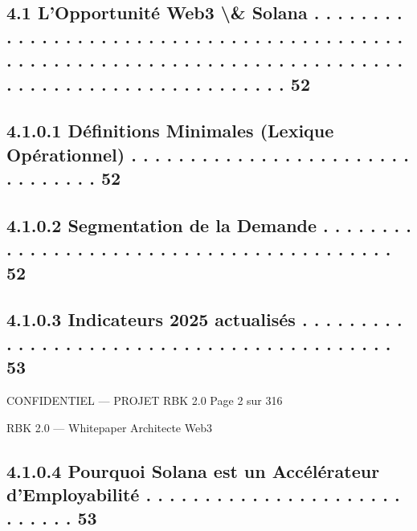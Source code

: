 \subsection{4.1     L’Opportunité Web3 \textbackslash{}& Solana . . . . . . . . . . . . . . . . . . . . . . . . . . . . . . . . . . . . . . . . . . . . . . . . . . . . . . . . . . . . . . . . . . . . . . . . . . . . . . . . . . . . . . . . . . . . . . . . . . . . 52}
\subsection{4.1.0.1           Définitions Minimales (Lexique Opérationnel) . . . . . . . . . . . . . . . . . . . . . . . . . . . . . . . .                                                                                                                 52}
\subsection{4.1.0.2           Segmentation de la Demande . . . . . . . . . . . . . . . . . . . . . . . . . . . . . . . . . . . . . . . . .                                                                                                                 52}
\subsection{4.1.0.3           Indicateurs 2025 actualisés . . . . . . . . . . . . . . . . . . . . . . . . . . . . . . . . . . . . . . . . . .                                                                                                              53}
\vspace{0.5em}
\vspace{0.5em}
\vspace{0.5em}
\begin{confidential}CONFIDENTIEL — PROJET RBK 2.0                                                                               Page 2 sur 316\end{confidential}
RBK 2.0 — Whitepaper Architecte Web3\\
\vspace{0.5em}
\vspace{0.5em}
\subsection{4.1.0.4           Pourquoi Solana est un Accélérateur d’Employabilité                                                         . . . . . . . . . . . . . . . . . . . . . . . . . . . .                                                    53}
